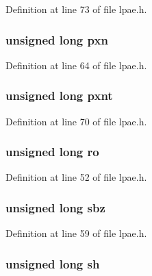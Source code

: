 \-Definition at line 73 of file lpae.\-h.

\hypertarget{structlpae__pt__t_ac47dd62f5bdb2c1f62fe7a83f23b8902}{
\subsubsection[{pxn}]{\setlength{\rightskip}{0pt plus 5cm}unsigned long {\bf pxn}}}\label{structlpae__pt__t_ac47dd62f5bdb2c1f62fe7a83f23b8902}


\-Definition at line 64 of file lpae.\-h.

\hypertarget{structlpae__pt__t_a23cf82105349863d2f84c49d7410180a}{
\subsubsection[{pxnt}]{\setlength{\rightskip}{0pt plus 5cm}unsigned long {\bf pxnt}}}\label{structlpae__pt__t_a23cf82105349863d2f84c49d7410180a}


\-Definition at line 70 of file lpae.\-h.

\hypertarget{structlpae__pt__t_aab6cd914c5bb4ca31f78a11024e97a05}{
\subsubsection[{ro}]{\setlength{\rightskip}{0pt plus 5cm}unsigned long {\bf ro}}}\label{structlpae__pt__t_aab6cd914c5bb4ca31f78a11024e97a05}


\-Definition at line 52 of file lpae.\-h.

\hypertarget{structlpae__pt__t_ae5b1c215d1172ca33cb4cc70b4484406}{
\subsubsection[{sbz}]{\setlength{\rightskip}{0pt plus 5cm}unsigned long {\bf sbz}}}\label{structlpae__pt__t_ae5b1c215d1172ca33cb4cc70b4484406}


\-Definition at line 59 of file lpae.\-h.

\hypertarget{structlpae__pt__t_a8388cd14eb45903279fca66cedfa5ec7}{
\subsubsection[{sh}]{\setlength{\rightskip}{0pt plus 5cm}unsigned long {\bf sh}}}\label{structlpae__pt__t_a8388cd14eb45903279fca66cedfa5ec7}


